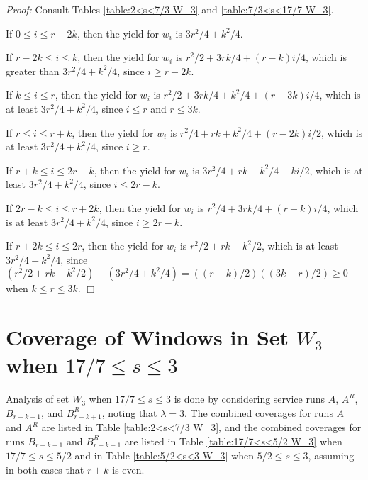 \documentclass[11pt]{article}
\newcommand\QED{\ifhmode\allowbreak\else\nobreak\fi
\quad\nobreak$\Box$\medbreak}
\newcommand{\proofstart}{\par\noindent \emph{Proof:} }
\newcommand{\proofend}{\QED\par}
\newenvironment{proof}{\proofstart}{\proofend}
\begin{document}
\begin{proof}
Consult Tables \ref{table:2<s<7/3 W_3} and \ref{table:7/3<s<17/7 W_3}.

If $0 \leq i \leq r - 2k$, then the yield for $w_i$ is $3r^2/4 + k^2/4$.

If $r - 2k \leq i \leq k$, then the yield for $w_i$ is $r^2/2 + 3rk/4 + (r - k)i/4$, which is greater than $3r^2/4 + k^2/4$, since $i \geq r - 2k$.

If $k \leq i \leq r$, then the yield for $w_i$ is $r^2/2 + 3rk/4 + k^2/4 + (r - 3k)i/4$, which is at least $3r^2/4 + k^2/4$, since $i \leq r$ and $r \leq 3k$.

If $r \leq i \leq r + k$, then the yield for $w_i$ is $r^2/4 + rk + k^2/4 + (r - 2k)i/2$, which is at least $3r^2/4 + k^2/4$, since $i \geq r$.

If $r + k \leq i \leq 2r - k$, then the yield for $w_i$ is $3r^2/4 + rk - k^2/4 - ki/2$, which is at least $3r^2/4 + k^2/4$, since  $i \leq 2r - k$.

If $2r - k \leq i \leq r + 2k$, then the yield for $w_i$ is $r^2/4 + 3rk/4 + (r - k)i/4$, which is at least $3r^2/4 + k^2/4$, since $i \geq 2r - k$.

If $r + 2k \leq i \leq 2r$, then the yield for $w_i$ is $r^2/2 + rk - k^2/2$, which is at least $3r^2/4 + k^2/4$, since $(r^2/2 + rk - k^2/2) - (3r^2/4 + k^2/4) = ((r - k)/2)((3k - r)/2) \geq 0$ when $k \leq r \leq 3k$.
\end{proof}



\section{Coverage of Windows in Set $W_3$ when $17/7 \leq s \leq 3$}
\label{appendix:17/7<s<3 W_3}

Analysis of set $W_3$ when $17/7 \leq s \leq 3$ is done by considering service runs $A$, $A^R$, $B_{r - k + 1}$, and $B_{r - k + 1}^R$, noting that $\lambda = 3$.  The combined coverages for runs $A$ and $A^R$ are listed in Table \ref{table:2<s<7/3 W_3}, and the combined coverages for runs $B_{r - k + 1}$ and $B_{r - k + 1}^R$ are listed in Table \ref{table:17/7<s<5/2 W_3} when $17/7 \leq s \leq 5/2$ and in Table \ref{table:5/2<s<3 W_3} when $5/2 \leq s \leq 3$, assuming in both cases that $r + k$ is even.\\
\end{document}
